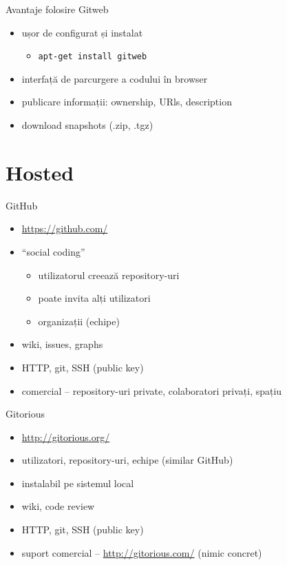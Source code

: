 \documentclass{simple}
\begin{document}
\begin{frame}{Avantaje folosire Gitweb}
	\begin{itemize}
		\item ușor de configurat și instalat
          \begin{itemize}
            \item \texttt{apt-get install gitweb}
          \end{itemize}
		\item interfață de parcurgere a codului în browser
        \item publicare informații: ownership, URls, description
        \item download snapshots (.zip, .tgz)
	\end{itemize}
\end{frame}

\section{Hosted}

\begin{frame}{GitHub}
  \begin{itemize}
    \item \url{https://github.com/}
    \item ``social coding''
      \begin{itemize}
        \item utilizatorul creează repository-uri
        \item poate invita alți utilizatori
        \item organizații (echipe)
      \end{itemize}
    \item wiki, issues, graphs
    \item HTTP, git, SSH (public key)
    \item comercial -- repository-uri private, colaboratori privați, spațiu
  \end{itemize}
\end{frame}

\begin{frame}{Gitorious}
  \begin{itemize}
    \item \url{http://gitorious.org/}
    \item utilizatori, repository-uri, echipe (similar GitHub)
    \item instalabil pe sistemul local
    \item wiki, code review
    \item HTTP, git, SSH (public key)
    \item suport comercial -- \url{http://gitorious.com/} (nimic concret)
  \end{itemize}
\end{frame}
\end{document}
